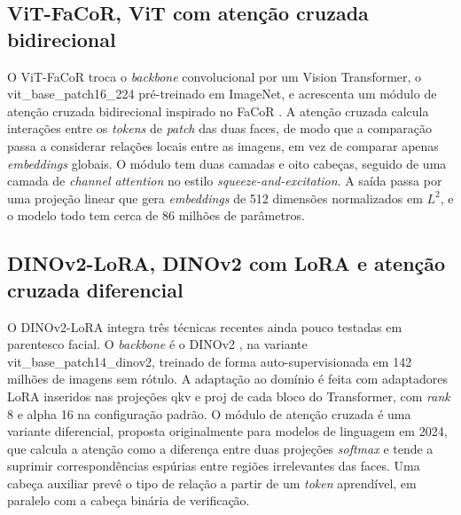 \subsection{ViT-FaCoR, ViT com atenção cruzada bidirecional}

O ViT-FaCoR troca o \textit{backbone} convolucional por um Vision Transformer, o vit\_base\_patch16\_224 pré-treinado em ImageNet, e acrescenta um módulo de atenção cruzada bidirecional inspirado no FaCoR \cite{su2023facornet}. A atenção cruzada calcula interações entre os \textit{tokens} de \textit{patch} das duas faces, de modo que a comparação passa a considerar relações locais entre as imagens, em vez de comparar apenas \textit{embeddings} globais. O módulo tem duas camadas e oito cabeças, seguido de uma camada de \textit{channel attention} no estilo \textit{squeeze-and-excitation}. A saída passa por uma projeção linear que gera \textit{embeddings} de 512 dimensões normalizados em $L^2$, e o modelo todo tem cerca de 86 milhões de parâmetros.

\subsection{DINOv2-LoRA, DINOv2 com LoRA e atenção cruzada diferencial}

O DINOv2-LoRA integra três técnicas recentes ainda pouco testadas em parentesco facial. O \textit{backbone} é o DINOv2 \cite{oquab2024dinov2}, na variante vit\_base\_patch14\_dinov2, treinado de forma auto-supervisionada em 142 milhões de imagens sem rótulo. A adaptação ao domínio é feita com adaptadores LoRA \cite{hu2021lora} inseridos nas projeções qkv e proj de cada bloco do Transformer, com \textit{rank} 8 e alpha 16 na configuração padrão. O módulo de atenção cruzada é uma variante diferencial, proposta originalmente para modelos de linguagem em 2024, que calcula a atenção como a diferença entre duas projeções \textit{softmax} e tende a suprimir correspondências espúrias entre regiões irrelevantes das faces. Uma cabeça auxiliar prevê o tipo de relação a partir de um \textit{token} aprendível, em paralelo com a cabeça binária de verificação.

